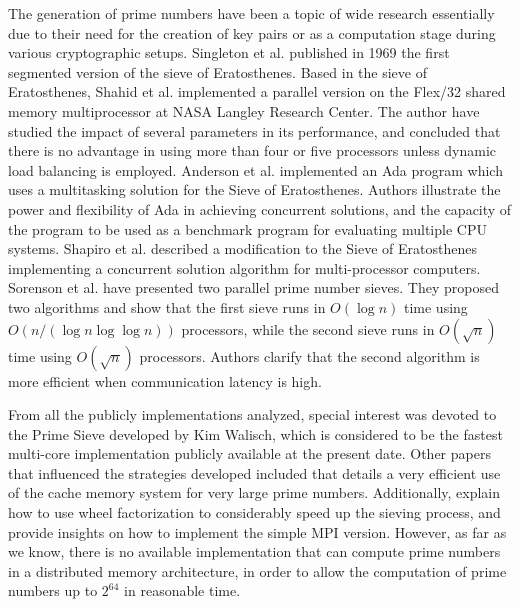 \documentclass[runningheads,a4paper]{llncs}
\begin{document}
The generation of prime numbers have been a topic of wide research essentially due to their need for the creation of key pairs or as a computation stage during various cryptographic setups. Singleton et al. \cite{singleton1969efficient} published in 1969 the first segmented version of the sieve of Eratosthenes. Based in the sieve of Eratosthenes, Shahid et al. \cite{bokhari1987multi} implemented a parallel version on the Flex/32 shared memory multiprocessor at NASA Langley Research Center. The author have studied the impact of several parameters in its performance, and concluded that there is no advantage in using more than four or five processors unless dynamic load balancing is employed. Anderson et al. \cite{anderson1988ada} implemented an Ada program which uses a multitasking solution for the Sieve of Eratosthenes. Authors illustrate the power and flexibility of Ada in achieving concurrent solutions, and the capacity of the program to be used as a benchmark program for evaluating multiple CPU systems. Shapiro et al. \cite{shapiro1989family} described a modification to the Sieve of Eratosthenes implementing a concurrent solution algorithm for multi-processor computers. Sorenson et al. \cite{sorenson1994fast} have presented two parallel prime number sieves. They proposed two algorithms and show that the first sieve runs in $O(\log{n})$ time using $O(n/(\log{n} \log{\log{n}}))$ processors, while the second sieve runs in $O(\sqrt{n})$ time using $O(\sqrt{n})$ processors. Authors clarify that the second algorithm is more efficient when communication latency is high. 

From all the publicly implementations analyzed, special interest was devoted to the Prime Sieve \cite{kim2013} developed by Kim Walisch, which is considered to be the fastest multi-core implementation publicly available at the present date. Other papers that influenced the strategies developed included \cite{jarai2011cache} that details a very efficient use of the cache memory system for very large prime numbers. Additionally, \cite{paillard2005fully} \cite{sorenson1991analysis} explain how to use wheel factorization to considerably speed up the sieving process, and \cite{david2009parallel} \cite{cordeiro2012parallelization} provide insights on how to implement the simple MPI \cite{gropp1999mpi} version. However, as far as we know, there is no available implementation that can compute prime numbers in a distributed memory architecture, in order to allow the computation of prime numbers up to $2^{64}$ in reasonable time.
\end{document}
